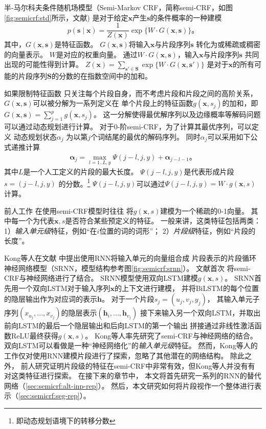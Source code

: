 半-马尔科夫条件随机场模型（Semi-Markov CRF，简称semi-CRF，如图\ref{fig:semicrf:std}所示，文献) 
是对于给定$\mathbf{x}$产生$\mathbf{s}$的条件概率的一种建模
\[
p(\mathbf{s} \mid \mathbf{x})=\frac{1}{Z(\mathbf{x})}\exp\{W \cdot G(\mathbf{x},\mathbf{s})\}\text{。}
\]
其中，$G(\mathbf{x},\mathbf{s})$是特征函数。
$G(\mathbf{x}, \mathbf{s})$将输入$\mathbf{x}$与片段序列$\mathbf{s}$
转化为或稀疏或稠密的向量表示。
$W$是对应的权重向量。
通过$W \cdot G(\mathbf{x},\mathbf{s})$，输入$\mathbf{x}$与片段序列$\mathbf{s}$
共同出现的可能性得到计算。
$Z(\mathbf{x})=\sum_{\mathbf{s'}\in \mathbf{S}} \exp\{W \cdot G(\mathbf{x}, \mathbf{s'})\}$
是对于$\mathbf{x}$的所有可能的片段序列$\mathbf{S}$的分数的在指数空间中的加和。

如果限制特征函数
只关注每个片段自身，而不考虑片段和片段之间的高阶关系，
$G(\mathbf{x},\mathbf{s})$可以被分解为一系列定义在
单个片段上的特征函数$g(\mathbf{x},s_j)$的加和，即
$G(\mathbf{x}, \mathbf{s})=\sum_{j=1}^p g(\mathbf{x},s_j)$。
这一分解使得最优解序列以及边缘概率等解码问题可以通过动态规划进行计算。
对于0-阶semi-CRF，为了计算其最优序列，可以定义
动态规划状态$\alpha_j$
为以第$j$个词结尾的最优的解码序列。
同时$\alpha_j$可以采用如下公式递推计算
\begin{align}\label{eq:semicrf:dp}
\mathbf{\alpha}_j=\max_{l=1..L,y} \Psi(j-l,j,y) + \mathbf{\alpha}_{j-l-1}\text{。}
\end{align}
其中$L$是一个人工定义的片段的最大长度。
$\Psi(j-l,j,y)$是代表形成片段$s=(j-l,j,y)$
的分数。\footnote{即动态规划语境下的转移分数}
$\Psi(j-l,j,y)$可以通过$\Psi(j-l,j,y)=W\cdot g(\mathbf{x}, s)$计算。

前人工作\cite{NIPS2005_427,okanohara-EtAl:2006:COLACL,andrew:2006:EMNLP,yang-cardie:2012:EMNLP-CoNLL}
在使用semi-CRF模型时往往
将$g(\mathbf{x},s)$建模为一个稀疏的0-1向量。
其中每一个为代表$\mathbf{x},s$是否符合某些预定义的特征。
一般来讲，这类特征包括两类：1）\textit{输入单元级}特征，例如``在$i$位置的词的词形''；
2）\textit{片段级}特征，例如``片段的长度''。

Kong等人在文献
中提出使用RNN将输入单元的向量组合成
片段表示的片段循环神经网络模型（SRNN，模型结构参考图\ref{fig:semicrf:srnn}）。
文献首次
将semi-CRF与神经网络进行了结合。
SRNN模型使用双向LSTM建模$g(\mathbf{x}, s)$。
SRNN首先用一个双向LSTM对于输入序列$\mathbf{x}$的上下文进行建模，
并将BiLSTM的每个位置的隐层输出作为对应词的表示$\mathbf{h}$。
对于一个片段$s_j=(u_j,v_j,y_j)$，
其输入单元子序列$(x_{u_j}, ..., x_{v_j})$的隐层表示$(\mathbf{h}_i, ..., \mathbf{h}_{v_j})$
接下来输入另一个双向LSTM，并取出前向LSTM的最后一个隐层输出和后向LSTM的第一个输出
拼接通过非线性激活函数ReLU最终获得$g(\mathbf{x}, s)$。
Kong等人\cite{DBLP:journals/corr/KongDS15}率先研究了semi-CRF与神经网络的结合。
双向LSTM可以看做是一种``神经网络化''的\textit{输入单元级}特征。
然而，Kong等人的工作仅对使用RNN建模片段进行了探索，忽略了其他潜在的网络结构。
除此之外，
前人研究证明片段级的特征在semi-CRF中非常有效，但Kong等人并没有有对这类特征进行探索。
在接下来的章节中，
本文将首先研究一系列的RNN的替代网络（\ref{sec:semicrf:alt-inp-rep}）。
然后，本文研究如何将片段视作一个整体进行表示（\ref{sec:semicrf:seg-rep}）。


